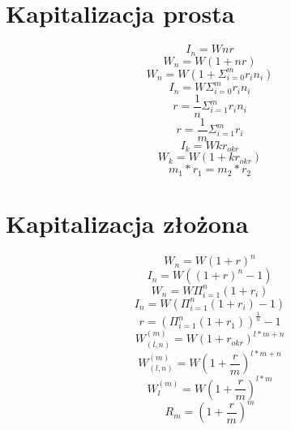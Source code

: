 \documentclass{article}
\begin{document}
\begin{center}

\section{Kapitalizacja prosta}

	\begin{equation}
		I_n = Wnr
	\end{equation}
	\begin{equation}
		W_n = W(1+nr)
	\end{equation}
	\begin{equation}
		W_n = W(1 + \Sigma^m_{i=0}r_in_i)
	\end{equation}
	\begin{equation}
		I_n = W\Sigma^m_{i=0}r_in_i
	\end{equation}
	\begin{equation}
		r = \frac{1}{n}\Sigma^m_{i=1}r_in_i
	\end{equation}
	\begin{equation}
		r = \frac{1}{m}\Sigma^m_{i=1}r_i
	\end{equation}
	\begin{equation}
		I_k = Wkr_{okr}
	\end{equation}
	\begin{equation}
		W_k = W(1 + kr_{okr})
	\end{equation}
	\begin{equation}
		m_1 * r_1 = m_2 * r_2
	\end{equation}
	
	\section{Kapitalizacja złożona}
	
	\begin{equation}
		W_n = W(1+r)^n
	\end{equation}
	\begin{equation}
		I_n = W((1+r)^n - 1)
	\end{equation}
	\begin{equation}
		W_n = W\Pi^n_{i=1}(1 + r_i)
	\end{equation}
	\begin{equation}
		I_n = W(\Pi^n_{i=1}(1 + r_i) - 1)
	\end{equation}
	\begin{equation}
		r = (\Pi^n_{i=1}(1 + r_1))^{\frac{1}{n}} - 1
	\end{equation}
	\begin{equation}
		W^{(m)}_{(l, n)} = W(1 + r_{okr})^{l * m + n}
	\end{equation}
	\begin{equation}
		W^{(m)}_{(l, n)} = W(1 + \frac{r}{m})^{l*m+n}
	\end{equation}
	\begin{equation}
		W^{(m)}_{l} = W(1 + \frac{r}{m})^{l*m}
	\end{equation}
	\begin{equation}
		R_m = (1 + \frac{r}{m})^m
	\end{equation}
	

\end{center}
\end{document}
